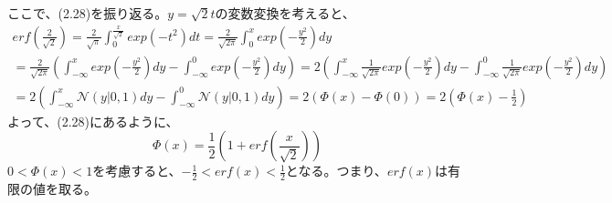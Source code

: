 \documentclass{jsarticle}
\begin{document}
ここで、(2.28)を振り返る。$y = \sqrt{2} t$の変数変換を考えると、
\begin{equation}
\begin{split}
erf(\frac{2}{\sqrt{2}}) = \frac{2}{\sqrt{\pi}}\int_0^{\frac{x}{\sqrt{2}}} exp(-t^2) dt
= \frac{2}{\sqrt{2\pi}} \int_0^{x} exp(-\frac{y^2}{2}) dy\\
= \frac{2}{\sqrt{2\pi}} (\int_{-\infty}^x exp(-\frac{y^2}{2}) dy - \int_{-\infty}^0 exp(-\frac{y^2}{2}) dy)
= 2 (\int_{-\infty}^x \frac{1}{\sqrt{2\pi}} exp(-\frac{y^2}{2}) dy - \int_{-\infty}^0 \frac{1}{\sqrt{2\pi}} exp(-\frac{y^2}{2}) dy)\\
= 2 (\int_{-\infty}^x \mathcal{N}(y | 0, 1) dy - \int_{-\infty}^0 \mathcal{N}(y | 0, 1) dy)
= 2 (\Phi(x) - \Phi(0))
= 2 (\Phi(x) - \frac{1}{2})
\end{split}
\end{equation}
よって、(2.28)にあるように、
\begin{equation}
\Phi(x) = \frac{1}{2}(1 + erf(\frac{x}{\sqrt{2}}))
\end{equation}
$0 < \Phi(x) < 1$を考慮すると、$-\frac{1}{2} < erf(x) < \frac{1}{2}$となる。つまり、$erf(x)$は有限の値を取る。
\end{document}
